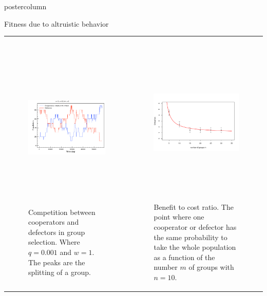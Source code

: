 \documentclass[final,hyperref={pdfpagelabels=false}]{beamer}
\begin{document}
\begin{frame}
\begin{columns}
\begin{column}{.49\textwidth}
\begin{beamercolorbox}[center,wd=\textwidth]{postercolumn}
\begin{minipage}[T]{.95\textwidth}
{\begin{block}{Fitness due to altruistic behavior}
\begin{tabularx}{\linewidth}{ZZ}
\begin{figure}
\begin{center}
  \includegraphics[width=11cm,height=8cm]{images/groupselection.pdf}
     \end{center}
    \caption{Competition between cooperators and defectors in group selection. Where $q=0.001$ and $w=1$. The peaks are the splitting of a group.} 
   \end{figure}
&
\begin{figure}
        \begin{center}
  \includegraphics[width=11cm,height=8cm]{images/cirticbc.pdf}
     \end{center}
      \caption{Benefit to cost ratio. The point where one cooperator or defector has the same probability to take the whole population as a function of the number $m$ of groups with $n=10$. } 
   \end{figure}
   \\
\end{tabularx}

\end{block}}
\end{minipage}
\end{beamercolorbox}
\end{column}
\end{columns}
\end{frame}
\end{document}
